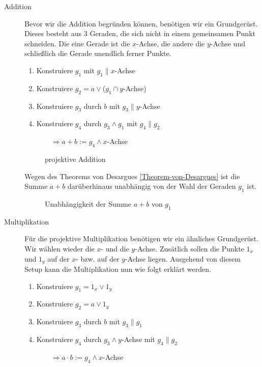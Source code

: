     \begin{description}
        \item[Addition] Bevor wir die Addition begründen können, benötigen wir ein Grundgerüst. Dieses besteht aus $3$ Geraden, 
              die sich nicht in einem gemeinsamen Punkt schneiden. Die eine Gerade ist die $x$-Achse, die andere die $y$-Achse und 
              schließlich die Gerade unendlich ferner Punkte.
              \begin{enumerate}
                \item Konstruiere $g_1$ mit $g_1 \parallel x$-Achse
                \item Konstruiere $g_2 = a \vee $($g_1\cap y$-Achse)
                \item Konstruiere $g_3$ durch $b$ mit $g_3 \parallel y$-Achse
                \item Konstruiere $g_4$ durch $g_3 \wedge g_1$ mit $g_4 \parallel g_2$ \par
                      $\qquad \Rightarrow a+b := g_4 \wedge x$-Achse 
              \end{enumerate}
              
              \begin{figure}[h]
                
                \caption{projektive Addition}
              \end{figure}

              Wegen des Theorems von Desargues \ref{Theorem-von-Desargues} ist die Summe $a+b$ darüberhinaus unabhängig von der Wahl 
              der Geraden $g_1$ ist. 

              \begin{figure}[h]
                
                \caption{Unabhängigkeit der Summe $a+b$ von $g_1$}
              \end{figure}
            
        \item[Multiplikation] Für die projektive Multiplikation benötigen wir ein ähnliches Grundgerüst. Wir wählen wieder die $x$- und 
              die $y$-Achse. Zusätlich sollen die Punkte $1_x$ und $1_y$ auf der $x$- bzw. auf der $y$-Achse liegen. Ausgehend von diesem
              Setup kann die Multiplikation nun wie folgt erklärt werden.
              
              \begin{enumerate}
                \item Konstruiere $g_1 = 1_x \vee 1_y$
                \item Konstruiere $g_2 = a \vee 1_y$
                \item Konstruiere $g_3$ durch $b$ mit $g_3 \parallel g_1$
                \item Konstruiere $g_4$ durch $g_3 \wedge y$-Achse mit $g_4 \parallel g_2$ \par
                      $\qquad \Rightarrow a\cdot b := g_4 \wedge x$-Achse 
              \end{enumerate}             
              

\end{description}
